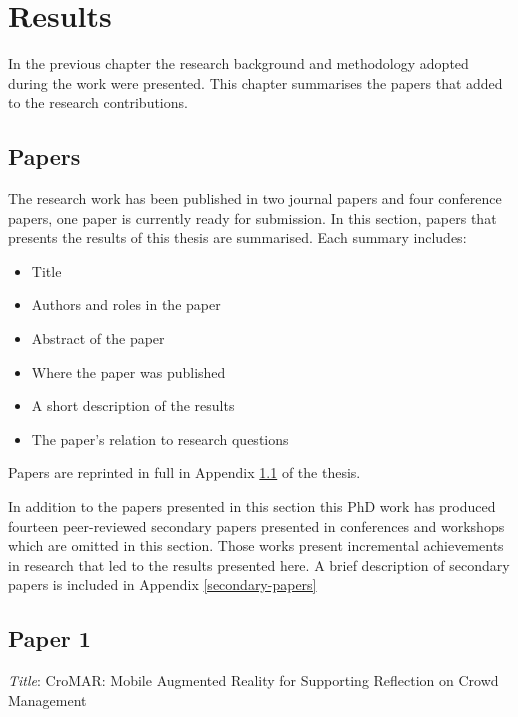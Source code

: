 \chapter{Results}\label{results}


In the previous chapter the research background and methodology adopted during the work were presented. This chapter summarises the papers that added to the research contributions.

\section{Papers}\label{papers}

The research work has been published in two journal papers and four conference papers, one paper is currently ready for submission. In this section, papers that presents the results of this thesis are summarised. Each summary includes: 
\begin{itemize}
	\itemsep1pt\parskip0pt 
	\item Title 
	\item Authors and roles in the paper 
	\item Abstract of the paper
	\item Where the paper was published 
	\item A short description of the results 
	\item The paper's relation to research questions 
\end{itemize}

Papers are reprinted in full in Appendix \ref{papers} of the thesis.

In addition to the papers presented in this section this PhD work has produced fourteen peer-reviewed secondary papers presented in conferences and workshops which are omitted in this section. Those works present incremental achievements in research that led to the results presented here. A brief description of secondary papers is included in Appendix \ref{secondary-papers}

\section[CroMAR: Mobile Augmented Reality for Supporting Reflection on Crowd Management]{Paper 1} \label{paper-1}

\emph{Title}: CroMAR: Mobile Augmented Reality for Supporting Reflection on Crowd Management

